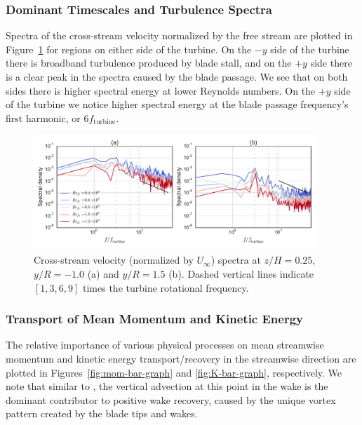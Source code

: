 \documentclass[energies,article,accept,moreauthors,pdftex,12pt,a4paper]{mdpi}
\begin{document}
\subsubsection{Dominant Timescales and Turbulence Spectra}

Spectra of the cross-stream velocity normalized by the free stream are plotted
in Figure~\ref{fig:wake-spectra} for regions on either side of the turbine. On
the $-y$ side of the turbine there is broadband turbulence produced by blade
stall, and on the $+y$ side there is a clear peak in the spectra caused by the
blade passage. We see that on both sides there is higher spectral energy at
lower Reynolds numbers. On the $+y$ side of the turbine we notice higher
spectral energy at the blade passage frequency's first harmonic, or $6
f_\mathrm{turbine}$.



\begin{figure}[ht!]
\centering
\includegraphics[width=0.95\textwidth]{figures/wake_spectra}
\caption{Cross-stream velocity (normalized by $U_\infty$) spectra at $z/H=0.25$, 
$y/R=-1.0$ (a) and $y/R=1.5$ (b). Dashed vertical
lines indicate $[1, 3, 6, 9]$ times the turbine rotational frequency.}
\label{fig:wake-spectra}
\end{figure}



\subsubsection{Transport of Mean Momentum and Kinetic Energy}

The relative importance of various physical processes on mean streamwise
momentum and kinetic energy transport/recovery in the streamwise direction are
plotted in Figures~\ref{fig:mom-bar-graph} and \ref{fig:K-bar-graph},
respectively. We note that similar to \cite{Bachant2015-JoT}, the vertical
advection at this point in the wake is the dominant contributor to positive wake
recovery, caused by the unique vortex pattern created by the blade tips and
wakes.
\end{document}
